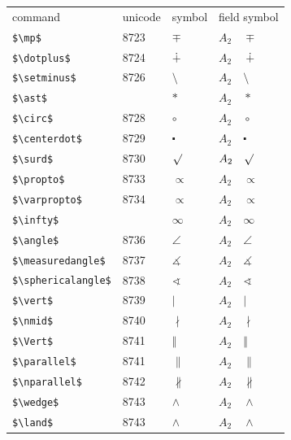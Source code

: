 ﻿\documentclass{article}
\begin{document}
\begin{table}
\begin{center}
\begin{tabular}{llll}
 command                  & unicode & symbol            & field symbol\\
 \verb#$\mp$#             & 8723    & $\mp$             & $A_2\quad \mp$\\
 \verb#$\dotplus$#        & 8724    & $\dotplus$        & $A_2\quad \dotplus$\\
 \verb#$\setminus$#       & 8726    & $\setminus$       & $A_2\quad \setminus$\\
 \verb#$\ast$#            &         & $\ast$            & $A_2\quad \ast$\\
 \verb#$\circ$#           & 8728    & $\circ$           & $A_2\quad \circ$\\
 \verb#$\centerdot$#      & 8729    & $\centerdot$      & $A_2\quad \centerdot$\\
 \verb#$\surd$#           & 8730    & $\surd$           & $A_2\quad \surd$\\
 \verb#$\propto$#         & 8733    & $\propto$         & $A_2\quad \propto$\\
 \verb#$\varpropto$#      & 8734    & $\varpropto$      & $A_2\quad \varpropto$\\
 \verb#$\infty$#          &         & $\infty$          & $A_2\quad \infty$\\
 \verb#$\angle$#          & 8736    & $\angle$          & $A_2\quad \angle$\\
 \verb#$\measuredangle$#  & 8737    & $\measuredangle$  & $A_2\quad \measuredangle$\\
 \verb#$\sphericalangle$# & 8738    & $\sphericalangle$ & $A_2\quad \sphericalangle$\\
 \verb#$\vert$#           & 8739    & $\vert$           & $A_2\quad \vert$\\
 \verb#$\nmid$#           & 8740    & $\nmid$           & $A_2\quad \nmid$\\
 \verb#$\Vert$#           & 8741    & $\Vert$           & $A_2\quad \Vert$\\
 \verb#$\parallel$#       & 8741    & $\parallel$       & $A_2\quad \parallel$\\
 \verb#$\nparallel$#      & 8742    & $\nparallel$      & $A_2\quad \nparallel$\\
 \verb#$\wedge$#          & 8743    & $\wedge$          & $A_2\quad \wedge$\\
 \verb#$\land$#           & 8743    & $\land$           & $A_2\quad \land$\\

\end{tabular}
\end{center}
\end{table}
\end{document}
